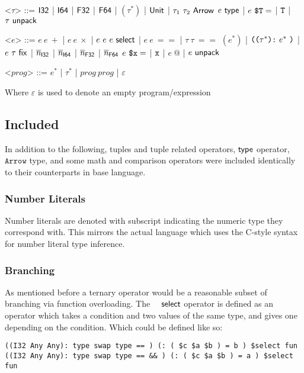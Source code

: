 \documentclass[acmsmall, review]{acmart}
\theoremstyle{definition}
\begin{document}
\renewcommand{\grammarlabel}[2]{#1 \hfill#2}
\begin{grammar}
    <$\tau$> ::= $\mathsf{I32}$
    |    $\mathsf{I64}$
    |    $\mathsf{F32}$
    |    $\mathsf{F64}$
    |    $(\tau^*)$
    |    $\mathsf{Unit}$
    |    $\tau_1 ~ \tau_2 ~ \mathsf{Arrow}$
    \alt $e ~ \mathsf{type}$
    |    $e~ \texttt{\$T} =$
    |    $\texttt{T}$
    |    $\tau ~ \mathsf{unpack}$

    <$e$> ::= $e~ e~ +$
    |    $e~ e~ \times$
    |    $e ~ e ~ e ~ \mathsf{select} $
    |    $e~ e~ ==$
    |    $\tau~ \tau~ ==$
    \alt $(e^*)$
    |    $\texttt{((} \tau^* \texttt{):} ~ e^* ~ \texttt{)}$
    |    $e ~ \tau ~ \mathsf{fix}$
    |    $\overline{n}_{\mathsf{I32}}$
    |    $\overline{n}_{\mathsf{I64}}$
    |    $\overline{n}_{\mathsf{F32}}$
    |    $\overline{n}_{\mathsf{F64}}$
    \alt $e~ \texttt{\$x} =$
    |    $\texttt{x}$
    |    $e~ \textbf{@} $
    |    $e ~ \mathsf{unpack}$
    
    <$prog$> ::= $e^*$ | $\tau^*$ | $prog~ prog$ | $\varepsilon$
\end{grammar}
Where $\varepsilon$ is used to denote an empty program/expression

\subsection{Included}
In addition to the following, tuples and tuple related operators,$~ \mathsf{type}$ operator, $\texttt{Arrow}$ type, and some math and comparison operators were included identically to their counterparts in base language.

\subsubsection{Number Literals}
Number literals are denoted with subscript indicating the numeric type they correspond with.
This mirrors the actual language which uses the C-style syntax for number literal type inference.

\subsubsection{Branching}
As mentioned before a ternary operator would be a reasonable subset of branching via function overloading. The $~  ~  ~ \mathsf{select}$ operator is defined as an operator which takes a condition and two values of the same type, and gives one depending on the condition. Which could be defined like so:

\begin{verbatim}
((I32 Any Any): type swap type == ) (: ( $c $a $b ) = b ) $select fun
((I32 Any Any): type swap type == && ) (: ( $c $a $b ) = a ) $select fun
\end{verbatim}
\end{document}
